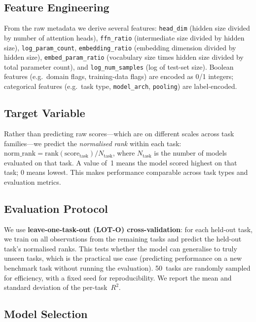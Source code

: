 \documentclass[11pt,a4paper,twocolumn]{article}
\begin{document}
\subsection{Feature Engineering}

From the raw metadata we derive several features: \texttt{head\_dim} (hidden size divided by number of attention heads), \texttt{ffn\_ratio} (intermediate size divided by hidden size), \texttt{log\_param\_count}, \texttt{embedding\_ratio} (embedding dimension divided by hidden size), \texttt{embed\_param\_ratio} (vocabulary size times hidden size divided by total parameter count), and \texttt{log\_num\_samples} (log of test-set size).
Boolean features (e.g.\ domain flags, training-data flags) are encoded as 0/1 integers; categorical features (e.g.\ task type, \texttt{model\_arch}, \texttt{pooling}) are label-encoded.

\subsection{Target Variable}

Rather than predicting raw scores---which are on different scales across task families---we predict the \emph{normalised rank} within each task: $ \text{norm\_rank} = \text{rank}(\text{score}_{\text{task}}) / N_{\text{task}} $, where $N_{\text{task}}$ is the number of models evaluated on that task.
A value of~1 means the model scored highest on that task; 0 means lowest.
This makes performance comparable across task types and evaluation metrics.

\subsection{Evaluation Protocol}

We use \textbf{leave-one-task-out (LOT-O) cross-validation}: for each held-out task, we train on all observations from the remaining tasks and predict the held-out task's normalised ranks.
This tests whether the model can generalise to truly unseen tasks, which is the practical use case (predicting performance on a new benchmark task without running the evaluation).
50~tasks are randomly sampled for efficiency, with a fixed seed for reproducibility.
We report the mean and standard deviation of the per-task~$R^2$.

\subsection{Model Selection}
\end{document}
